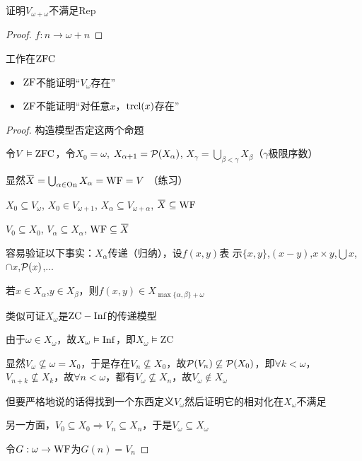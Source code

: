 \documentclass[11pt]{article}
\def \ZC {\text{ZC}}
\begin{document}
\begin{exercise}
证明\(V_{\omega+\omega}\)不满足Rep
\end{exercise}

\begin{proof}
\(f:n\to\omega+n\)
\end{proof}

\begin{proposition}[]
\label{7.8.3}
工作在\(\operatorname{ZFC}\)
\begin{itemize}
\item \(\operatorname{ZF}\)不能证明“\(V_\omega\)存在”
\item \(\operatorname{ZF}\)不能证明“对任意\(x\)，\(\operatorname{\text{trcl}}(x)\)存在”
\end{itemize}
\end{proposition}

\begin{proof}
构造模型否定这两个命题

令\(V\vDash\operatorname{ZFC}\)，令\(X_0=\omega\), \(X_{\alpha+1}=\mathcal{P}(X_\alpha)\), \(X_\gamma=\bigcup_{\beta<\gamma}X_\beta\)（\(\gamma\)极限序数）

显然\(\barX=\bigcup_{\alpha\in\On}X_\alpha=\WF=V\) （练习）

\(X_0\subseteq V_\omega\), \(X_0\in V_{\omega+1}\), \(X_\alpha\subseteq V_{\omega+\alpha}\), \(\barX\subseteq\WF\)

\(V_0\subseteq X_0\), \(V_\alpha\subseteq X_\alpha\), \(\WF\subseteq\barX\)

容易验证以下事实：\(X_\alpha\)传递（归纳），设\(f(x,y)\)表
示\(\{x,y\}\),\((x-y)\),\(x\times y\),\(\bigcup x\),\(\cap x\),\(\mathcal{P}(x)\),\(\dots\)

若\(x\in X_\alpha\),\(y\in X_\beta\)，则\(f(x,y)\in X_{\max\{\alpha,\beta\}+\omega}\)

类似可证\(X_\omega\)是\(\ZC-\Inf\)的传递模型

由于\(\omega\in X_\omega\)，故\(X_\omega\vDash\operatorname{Inf}\)，即\(X_\omega\vDash\ZC\)

显然\(V_\omega\not\subseteq\omega=X_0\)，于是存在\(V_n\not\subseteq X_0\)，故\(\mathcal{P}(V_n)\not\subseteq\mathcal{P}(X_0)\)，即\(\forall k<\omega\)，
\(V_{n+k}\not\subseteq X_k\)，故\(\forall n<\omega\)，都有\(V_\omega\not\subseteq X_n\)，故\(V_\omega\notin X_\omega\)

但要严格地说的话得找到一个东西定义\(V_\omega\)然后证明它的相对化在\(X_\omega\)不满足

另一方面，\(V_0\subseteq X_0\Rightarrow V_n\subseteq X_n\)，于是\(V_\omega\subseteq X_\omega\)

令\(G:\omega\to\operatorname{WF}\)为\(G(n)=V_n\)


\end{proof}
\end{document}
